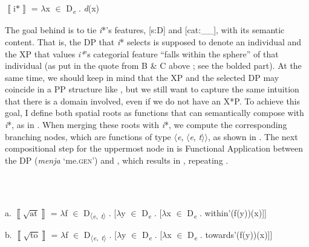 \documentclass[output=paper,colorlinks,citecolor=brown]{./langscibook}
\begin{document}
\ea%
    \label{ex:tsedryk:19}
    \gll\\
        \\
    \glt
    \z

           $\left\llbracket \text{i*}\right\rrbracket $ = ${\lambda}$x ${\in}$ D\textit{\textsubscript{e}} . \textit{d}(x)

The goal behind  is to tie \textit{i}*’s features, [s:D] and [cat:\_\_], with its semantic content. That is, the DP that \textit{i}* selects is supposed to denote an individual and the XP that values \textit{i*}’s categorial feature “falls within the sphere” of that individual (as put in the quote from B \& C above ; see the bolded part). At the same time, we should keep in mind that the XP and the selected DP may coincide in a PP structure like , but we still want to capture the same intuition that there is a domain involved, even if we do not have an X*P. To achieve this goal, I define both spatial roots as functions that can semantically compose with \textit{i}*, as in . When merging these roots with \textit{i}*, we compute the corresponding branching nodes, which are functions of type ${\langle}$\textit{e}, ${\langle}$\textit{e}, \textit{t}${\rangle}{\rangle}$, as shown in . The next compositional step for the uppermost node in  is Functional Application between the DP (\textit{menja} ‘me.\textsc{gen}’) and , which results in , repeating . 

\ea%
    \label{ex:tsedryk:20}
    \gll\\
        \\
    \glt
    \z

          a.   $\left\llbracket \sqrt{\text{at}}\right\rrbracket $ = ${\lambda}$f ${\in}$ D\textsubscript{${\langle}$}\textit{\textsubscript{e}}\textsubscript{,} \textit{\textsubscript{t}}\textsubscript{${\rangle}$} . [${\lambda}$y ${\in}$ D\textit{\textsubscript{e}} . [${\lambda}$x ${\in}$ D\textit{\textsubscript{e}} . within'(f(y))(x)]]         

  b.   $\left\llbracket \sqrt{\text{to}}\right\rrbracket $ = ${\lambda}$f ${\in}$ D\textsubscript{${\langle}$}\textit{\textsubscript{e}}\textsubscript{,} \textit{\textsubscript{t}}\textsubscript{${\rangle}$} . [${\lambda}$y ${\in}$ D\textit{\textsubscript{e}} . [${\lambda}$x ${\in}$ D\textit{\textsubscript{e}} . towards'(f(y))(x)]]

\ea%
    \label{ex:tsedryk:21}
    \gll\\
        \\
    \glt
    \z
\end{document}
